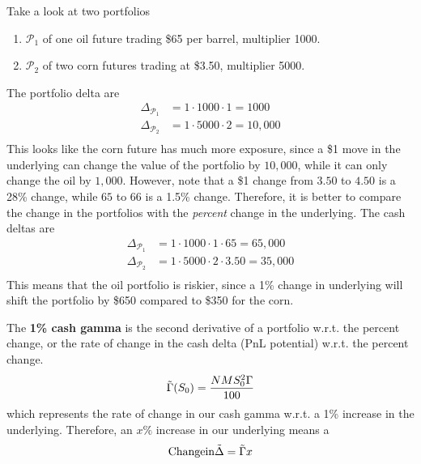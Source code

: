 \documentclass{article}
\begin{document}
    \begin{example}
      Take a look at two portfolios  
      \begin{enumerate}
        \item $\mathcal{P}_1$ of one oil future trading \$65 per barrel, multiplier 1000. 
        \item $\mathcal{P}_2$ of two corn futures trading at \$3.50, multiplier 5000. 
      \end{enumerate}
      The portfolio delta are 
      \begin{align}
        \Delta_{\mathcal{P}_1} & = 1 \cdot 1000 \cdot 1 = 1000 \\ 
        \Delta_{\mathcal{P}_2} & = 1 \cdot 5000 \cdot 2 = 10,000 \\ 
      \end{align}
      This looks like the corn future has much more exposure, since a \$1 move in the underlying can change the value of the portfolio by $10,000$, while it can only change the oil by $1,000$. However, note that a \$1 change from $3.50$ to $4.50$ is a 28\% change, while $65$ to $66$ is a 1.5\% change. Therefore, it is better to compare the change in the portfolios with the \textit{percent} change in the underlying. The cash deltas are 
      \begin{align}
        \Delta_{\mathcal{P}_1} & = 1 \cdot 1000 \cdot 1 \cdot 65 = 65,000 \\ 
        \Delta_{\mathcal{P}_2} & = 1 \cdot 5000 \cdot 2 \cdot 3.50 = 35,000 \\ 
      \end{align}
      This means that the oil portfolio is riskier, since a 1\% change in underlying will shift the portfolio by \$650 compared to \$350 for the corn. 
    \end{example}

    \begin{definition}
      The \textbf{1\% cash gamma} is the second derivative of a portfolio w.r.t. the percent change, or the rate of change in the cash delta (PnL potential) w.r.t. the percent change. 
      \begin{equation}
        \Tilde{\Gamma}(S_0) = \frac{N M S_0^2 \Gamma}{100} 
      \end{equation}
      which represents the rate of change in our cash gamma w.r.t. a 1\% increase in the underlying. Therefore, an $x\%$ increase in our underlying means a 
      \begin{equation}
        \mathrm{Change in } \Tilde{\Delta} = \Tilde{\Gamma} x
      \end{equation}
    \end{definition}
\end{document}
